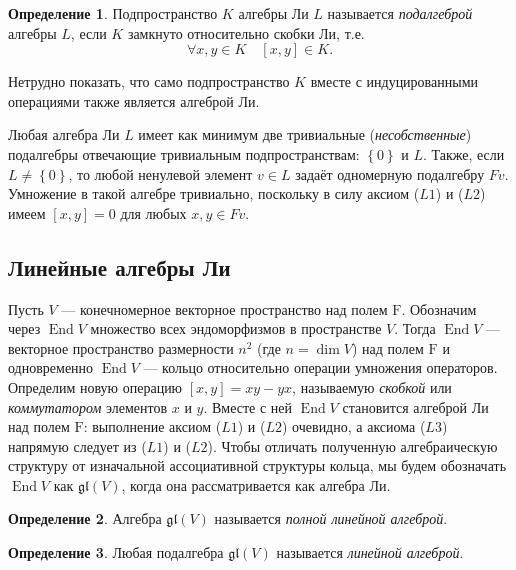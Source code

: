 \documentclass[a4paper, 12pt]{article}
\theoremstyle{definition}
\newtheorem{definition}{Определение}[section]
\begin{document}
\begin{definition}
    \label{def:subalgebras}
    Подпространство \( K \) алгебры Ли \( L \) называется \textit{подалгеброй} алгебры \( L \), если \( K \) замкнуто относительно скобки Ли, т.е.
    \[
        \forall x, y \in K \quad [x, y] \in K.
    \]
\end{definition}

Нетрудно показать, что само подпространство \( K \) вместе с индуцированными операциями также является алгеброй Ли.

Любая алгебра Ли \( L \) имеет как минимум две тривиальные (\textit{несобственные}) подалгебры отвечающие тривиальным подпространствам: \( \left\{ 0 \right\} \) и \( L \).
Также, если \( L \neq \left\{ 0 \right\} \), то любой ненулевой элемент \( v \in L \) задаёт одномерную подалгебру \( Fv \). Умножение в такой алгебре тривиально, поскольку в силу аксиом (\( L 1 \)) и (\( L 2 \)) имеем \( [x, y] = 0 \) для любых \( x, y \in Fv \).

\subsection{Линейные алгебры Ли}
\label{sub:linear_li_algebras}

Пусть \( V \) --- конечномерное векторное пространство над полем \( \mathrm F \). Обозначим через \( \operatorname{End} V \) множество всех эндоморфизмов в пространстве \( V \). Тогда \( \operatorname{End} V \) --- векторное пространство размерности \( n^2 \) (где \( n = \dim V \)) над полем \( \mathrm F \) и одновременно \( \operatorname{End} V \) --- кольцо относительно операции умножения операторов. Определим новую операцию \( [x, y] = xy - yx \), называемую \textit{скобкой} или \textit{коммутатором} элементов \( x \) и \( y \). Вместе с ней \( \operatorname{End} V \) становится алгеброй Ли над полем \( \mathrm F \): выполнение аксиом (\( L 1 \)) и (\( L 2 \)) очевидно, а аксиома (\( L 3 \)) напрямую следует из (\( L 1 \)) и (\( L 2 \)). Чтобы отличать полученную алгебраическую структуру от изначальной ассоциативной структуры кольца, мы будем обозначать \( \operatorname{End} V \) как \( \mathfrak{gl}(V) \), когда она рассматривается как алгебра Ли.

\begin{definition}
    Алгебра \( \mathfrak{gl}(V) \) называется \textit{полной линейной алгеброй}.
\end{definition}

\begin{definition}
    Любая подалгебра \( \mathfrak{gl}(V) \) называется \textit{линейной алгеброй}.
\end{definition}
\end{document}
